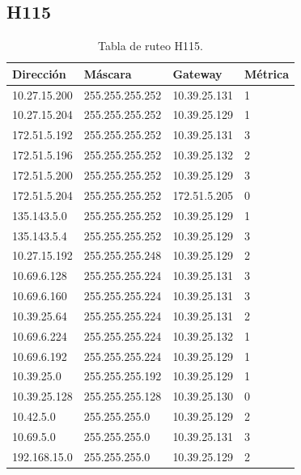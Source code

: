 \documentclass[12pt,titlepage]{article}
\begin{document}
\subsection{H115}
\begin{table}
  \begin{center}
    \begin{tabular}{|l|l|l|l|}
      \hline
        \bf{Direcci\'on} & \bf{M\'ascara} & \bf{Gateway} & \bf{M\'etrica} \\
      \hline 
	10.27.15.200  & 255.255.255.252 & 10.39.25.131 & 1 \\
        10.27.15.204  & 255.255.255.252 & 10.39.25.129 & 1 \\
        172.51.5.192  & 255.255.255.252 & 10.39.25.131 & 3 \\
        172.51.5.196  & 255.255.255.252 & 10.39.25.132 & 2 \\
        172.51.5.200  & 255.255.255.252 & 10.39.25.129 & 3 \\
        172.51.5.204  & 255.255.255.252 & 172.51.5.205 & 0 \\
        135.143.5.0   & 255.255.255.252 & 10.39.25.129 & 1 \\
        135.143.5.4   & 255.255.255.252 & 10.39.25.129 & 3 \\ 	
	10.27.15.192  & 255.255.255.248 & 10.39.25.129 & 2 \\
	10.69.6.128   & 255.255.255.224 & 10.39.25.131 & 3 \\
        10.69.6.160   & 255.255.255.224 & 10.39.25.131 & 3 \\
	10.39.25.64   & 255.255.255.224 & 10.39.25.131 & 2 \\       
	10.69.6.224   & 255.255.255.224 & 10.39.25.132 & 1 \\
	10.69.6.192   & 255.255.255.224 & 10.39.25.129 & 1 \\	
	10.39.25.0    & 255.255.255.192 & 10.39.25.129 & 1 \\
	10.39.25.128  & 255.255.255.128 & 10.39.25.130 & 0 \\
	10.42.5.0     & 255.255.255.0 & 10.39.25.129 & 2 \\
        10.69.5.0     & 255.255.255.0 & 10.39.25.131 & 3 \\
        192.168.15.0  & 255.255.255.0 & 10.39.25.129 & 2 \\  
    \hline
    \end{tabular} \\
  \end{center}
  \caption{Tabla de ruteo H115.}
\end{table}
\newpage
\end{document}
